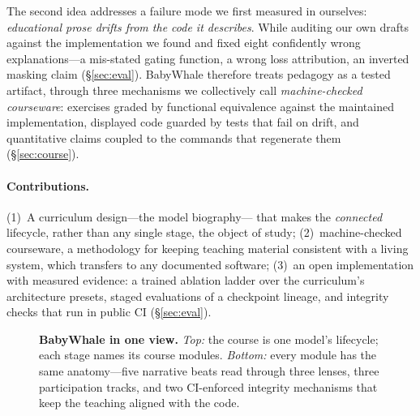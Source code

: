 The second idea addresses a failure mode we first measured in ourselves:
\emph{educational prose drifts from the code it describes}. While auditing our
own drafts against the implementation we found and fixed eight confidently
wrong explanations---a mis-stated gating function, a wrong loss attribution,
an inverted masking claim (\S\ref{sec:eval}). BabyWhale therefore treats
pedagogy as a tested artifact, through three mechanisms we collectively call
\emph{machine-checked courseware}: exercises graded by functional equivalence
against the maintained implementation, displayed code guarded by tests that
fail on drift, and quantitative claims coupled to the commands that
regenerate them (\S\ref{sec:course}).

\paragraph{Contributions.} (1)~A curriculum design---the model biography---%
that makes the \emph{connected} lifecycle, rather than any single stage, the
object of study; (2)~machine-checked courseware, a methodology for keeping
teaching material consistent with a living system, which transfers to any
documented software; (3)~an open implementation with measured evidence: a
trained ablation ladder over the curriculum's architecture presets, staged
evaluations of a checkpoint lineage, and integrity checks that run in public
CI (\S\ref{sec:eval}).

\begin{figure}[t]
  \centering
  
  \caption{\textbf{BabyWhale in one view.} \emph{Top:} the course is one
  model's lifecycle; each stage names its course modules. \emph{Bottom:} every
  module has the same anatomy---five narrative beats read through three
  lenses, three participation tracks, and two CI-enforced integrity
  mechanisms that keep the teaching aligned with the code.}
  \label{fig:lifecycle}
\end{figure}

